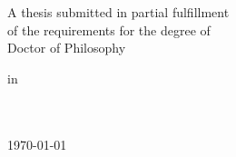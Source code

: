 \begin{titlepage}
  \centering
  \vspace*{2cm}

  {\Huge\bfseries \thesistitle\par}
  \vspace{1cm}
  {\Large \thesissubtitle\par}
  \vspace{2cm}

  {\Large\itshape \thesisauthor\par}
  \vfill

  {\large A thesis submitted in partial fulfillment\\
  of the requirements for the degree of\\
  Doctor of Philosophy\par}
  \vspace{1cm}

  {\large in\par}
  \vspace{0.5cm}
  {\Large\bfseries \thesisfield\par}
  \vfill

  {\large \thesisdepartment\\
  \thesisuniversity\\
  \vspace{0.5cm}
  \today\par}
\end{titlepage}

